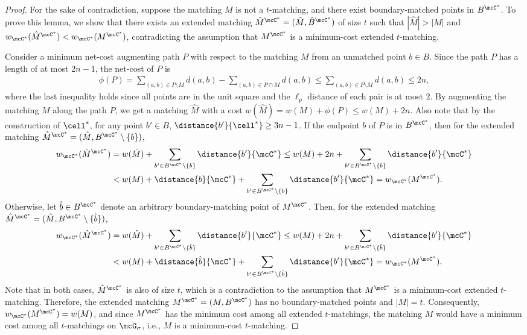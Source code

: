 \rootinactive*
\begin{proof}
    For the sake of contradiction, suppose the matching $M$ is not a $t$-matching, and there exist boundary-matched points in $B^{\mcC^*}$. To prove this lemma, we show that there exists an extended matching $\hat{M}^{\mcC^*}=(\hat{M}, \hat{B}^{\mcC^*})$ of size $t$ such that $|\hat{M}|>|M|$ and $w_{\mcC^*}(\hat{M}^{\mcC^*})<w_{\mcC^*}(M^{\mcC^*})$, contradicting the assumption that $M^{\mcC^*}$ is a minimum-cost extended $t$-matching. 

    Consider a minimum net-cost augmenting path $P$ with respect to the matching $M$ from an unmatched point $b\in B$. Since the path $P$ has a length of at most $2n-1$, the net-cost of $P$ is 
    \begin{align*}
        \phi(P) = \sum_{(a,b)\in P\setminus M}d(a,b) - \sum_{(a,b)\in P\cap M}d(a,b) \le \sum_{(a,b)\in P\setminus M}d(a,b) \le 2n,  
    \end{align*}
    where the last inequality holds since all points are in the unit square and the $\ell_p$ distance of each pair is at most $2$. By augmenting the matching $M$ along the path $P$, we get a matching $\hat{M}$ with a cost $w(\hat{M})=w(M)+\phi(P)\le w(M) + 2n$. Also note that by the construction of $\cell^*$, for any point $b'\in B$, $\distance{b'}{\cell^*}\ge 3n-1$. If the endpoint $b$ of $P$ is in $B^{\mcC^*}$, then for the extended matching $\hat{M}^{\mcC^*}=(\hat{M}, B^{\mcC^*}\setminus\{b\})$, 
    \begin{align*}
        w_{\mcC^*}(\hat{M}^{\mcC^*})&= w(\hat{M}) + \sum_{b'\in B^{\mcC^*}\setminus\{b\} }\distance{b'}{\mcC^*}
        \le w(M) + 2n + \sum_{b'\in B^{\mcC^*}\setminus\{b\} }\distance{b'}{\mcC^*}\\&<w(M) + \distance{b}{\mcC^*} + \sum_{b'\in B^{\mcC^*}\setminus\{b\}}\distance{b'}{\mcC^*}=
        w_{\mcC^*}(M^{\mcC^*}).
    \end{align*}
    Otherwise, let $\hat{b}\in B^{\mcC^*}$ denote an arbitrary boundary-matching point of $M^{\mcC^*}$. Then, for the extended matching $\hat{M}^{\mcC^*}=(\hat{M}, B^{\mcC^*}\setminus\{\hat{b}\})$, 
    \begin{align*}
        w_{\mcC^*}(\hat{M}^{\mcC^*})&= w(\hat{M}) + \sum_{b'\in B^{\mcC^*}\setminus\{\hat{b}\} }\distance{b'}{\mcC^*}
        \le w(M) + 2n + \sum_{b'\in B^{\mcC^*}\setminus\{\hat{b}\} }\distance{b'}{\mcC^*}\\&<w(M) + \distance{\hat{b}}{\mcC^*} + \sum_{b'\in B^{\mcC^*}\setminus\{\hat{b}\}}\distance{b'}{\mcC^*}=
        w_{\mcC^*}(M^{\mcC^*}).
    \end{align*}
    Note that in both cases, $\hat{M}^{\mcC^*}$ is also of size $t$, which is a contradiction to the assumption that $M^{\mcC^*}$ is a minimum-cost extended $t$-matching. Therefore, the extended matching $M^{\mcC^*}=(M, B^{\mcC^*})$ has no boundary-matched points and $|M| = t$. 
    Consequently, $w_{\mcC^*}(M^{\mcC^*}) = w(M)$, and since $M^{\mcC^*}$ has the minimum cost among all extended $t$-matchings, the matching $M$ would have a minimum cost among all $t$-matchings on $\mcG_\sigma$, i.e., $M$ is a minimum-cost $t$-matching.
\end{proof}

